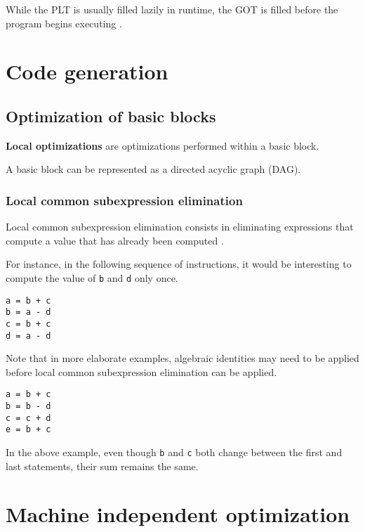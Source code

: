 While the PLT is usually filled lazily in runtime, the GOT is filled before the program begins executing \cite{computer-science-from-the-bottom-up}.

\section{Code generation}

\subsection{Optimization of basic blocks}

\textbf{Local optimizations} are optimizations performed within a basic block.

A basic block can be represented as a directed acyclic graph (DAG).

\subsubsection{Local common subexpression elimination}

Local common subexpression elimination consists in eliminating expressions that compute a value that has already been computed \cite[p.~533]{compilers-aho-2007}.

For instance, in the following sequence of instructions, it would be interesting to compute the value of \texttt{b} and \texttt{d} only once.

\begin{lstlisting}
a = b + c
b = a - d
c = b + c
d = a - d
\end{lstlisting}

Note that in more elaborate examples, algebraic identities may need to be applied before local common subexpression elimination can be applied.

\begin{lstlisting}
a = b + c
b = b - d
c = c + d
e = b + c
\end{lstlisting}

In the above example, even though \texttt{b} and \texttt{c} both change between the first and last statements, their sum remains the same.

\section{Machine independent optimization}
